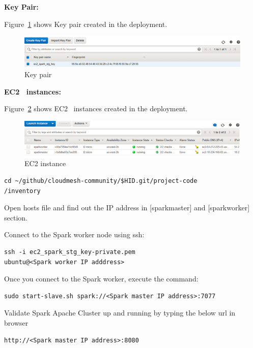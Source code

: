 \textbf{Key Pair:}

Figure~\ref{f:key-pair} shows Key pair created in the deployment.

\begin{figure}[!ht]
	\centering\includegraphics[width=\columnwidth]{images/keypair.png}
	\caption{Key pair}\label{f:key-pair}
\end{figure}

\textbf{EC2~\cite{hid-sp18-511-www-ec2} instances:}

Figure~\ref{f:ec2-instance} shows EC2~\cite{hid-sp18-511-www-ec2} instances created in the deployment.

\begin{figure}[!ht]
	\centering\includegraphics[width=\columnwidth]{images/ec2instances.png}
	\caption{EC2 instance}\label{f:ec2-instance}
\end{figure}


\begin{verbatim}
cd ~/github/cloudmesh-community/$HID.git/project-code
/inventory
\end{verbatim}

Open hosts file and find out the IP address in [sparkmaster] and
[sparkworker] section.

Connect to the Spark worker node using ssh:

\begin{verbatim}
ssh -i ec2_spark_stg_key-private.pem 
ubuntu@<Spark worker IP adddress>
\end{verbatim}

Once you connect to the Spark worker, execute the command:

\begin{verbatim}
sudo start-slave.sh spark://<Spark master IP address>:7077
\end{verbatim}

Validate Spark Apache Cluster up and running by typing the below url
in browser

\begin{verbatim}
http://<Spark master IP address>:8080
\end{verbatim}

